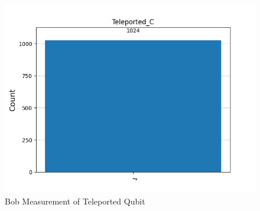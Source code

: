 \begin{figure}[h!]
    \centering
    \caption{Bob Measurement of Teleported Qubit}
    \label{bm2}    
    \begin{minipage}{0.49\textwidth}
        \centering
        \includegraphics[width=\linewidth]{exercise3/test/51c5350c-8263-4c16-85e8-2cce2067faf0__Teleported_C__counts.png}
    \end{minipage}
\end{figure}

\vspace{5cm} %
